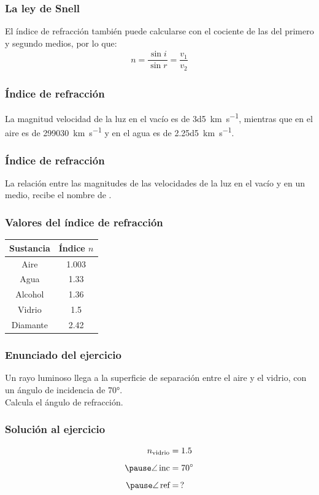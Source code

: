 \documentclass[14pt]{beamer}
\begin{document}
\begin{frame}
\frametitle{La ley de Snell}
El índice de refracción también puede calcularse con el cociente de las  del primero y segundo medios, por lo que:
\pause
\begin{align*}
n = \dfrac{\sin i}{\sin r} = \dfrac{v_{1}}{v_{2}}
\end{align*}
\end{frame}
\begin{frame}
\frametitle{Índice de refracción}
La magnitud velocidad de la luz en el vacío es de \SI{3d5}{\kilo\meter\per\second}, \pause mientras que en el aire es de \SI{299030}{\kilo\meter\per\second} \pause y en el agua es de \SI{2.25d5}{\kilo\meter\per\second}.
\end{frame}
\begin{frame}
\frametitle{Índice de refracción}
La relación entre las magnitudes de las velocidades de la luz en el vacío y en un medio, \pause recibe el nombre de .
\end{frame}
\begin{frame}
\frametitle{Valores del índice de refracción}
\begin{table}
\renewcommand{\arraystretch}{0.8}
\centering
\begin{tabular}{c | c}
Sustancia & Índice $n$\\ \hline
Aire & 1.003 \\ \hline
Agua & 1.33 \\ \hline
Alcohol & 1.36 \\ \hline
Vidrio & 1.5 \\ \hline
Diamante & 2.42 \\ \hline
\end{tabular}
\end{table}
\end{frame}
\begin{frame}
\frametitle{Enunciado del ejercicio}
Un rayo luminoso llega a la superficie de separación entre el aire y el vidrio, con un ángulo de incidencia de \ang{70}.
\\
\bigskip
\pause
Calcula el ángulo de refracción.
\end{frame}
\begin{frame}
\frametitle{Solución al ejercicio}
\pause
\begin{eqnarray*}
\begin{aligned}
n_{\text{vidrio}} &= 1.5 \\[0.5em] \pause
\angle \, \text{inc} &= \ang{70} \\[0.5em] \pause
\angle \, \text{ref} &= \, ?
\end{aligned}
\end{eqnarray*}
\end{frame}
\end{document}
